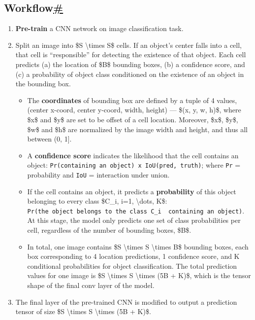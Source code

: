 \subsection{\texorpdfstring{Workflow\hyperref[workflow]{\#}}{Workflow\#}}\label{workflow}

\begin{enumerate}
\item
  \textbf{Pre-train} a CNN network on image classification task.
\item
  Split an image into \$S \textbackslash times S\$ cells. If an object's center falls into a cell, that cell is ``responsible'' for detecting the existence of that object. Each cell predicts (a) the location of \$B\$ bounding boxes, (b) a confidence score, and (c) a probability of object class conditioned on the existence of an object in the bounding box.

  \begin{itemize}
  \tightlist
  \item
    The \textbf{coordinates} of bounding box are defined by a tuple of 4 values, (center x-coord, center y-coord, width, height) --- \$(x, y, w, h)\$, where \$x\$ and \$y\$ are set to be offset of a cell location. Moreover, \$x\$, \$y\$, \$w\$ and \$h\$ are normalized by the image width and height, and thus all between (0, 1{]}.
  \item
    A \textbf{confidence score} indicates the likelihood that the cell contains an object: \texttt{Pr(containing\ an\ object)\ x\ IoU(pred,\ truth)}; where \texttt{Pr} = probability and \texttt{IoU} = interaction under union.
  \item
    If the cell contains an object, it predicts a \textbf{probability} of this object belonging to every class \$C\_i, i=1, \textbackslash dots, K\$: \texttt{Pr(the\ object\ belongs\ to\ the\ class\ C\_i\ \textbar{}\ containing\ an\ object)}. At this stage, the model only predicts one set of class probabilities per cell, regardless of the number of bounding boxes, \$B\$.
  \item
    In total, one image contains \$S \textbackslash times S \textbackslash times B\$ bounding boxes, each box corresponding to 4 location predictions, 1 confidence score, and K conditional probabilities for object classification. The total prediction values for one image is \$S \textbackslash times S \textbackslash times (5B + K)\$, which is the tensor shape of the final conv layer of the model.
  \end{itemize}
\item
  The final layer of the pre-trained CNN is modified to output a prediction tensor of size \$S \textbackslash times S \textbackslash times (5B + K)\$.
\end{enumerate}

